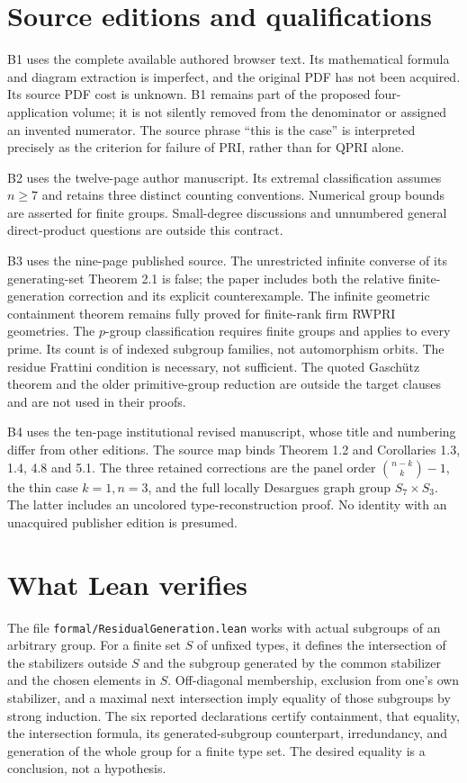\section{Source editions and qualifications}
B1 uses the complete available authored browser text. Its mathematical
formula and diagram extraction is imperfect, and the original PDF has
not been acquired. Its source PDF cost is unknown. B1 remains part of
the proposed four-application volume; it is not silently removed from
the denominator or assigned an invented numerator. The source phrase
``this is the case'' is interpreted precisely as the criterion for
failure of PRI, rather than for QPRI alone.

B2 uses the twelve-page author manuscript. Its extremal classification
assumes $n\geq7$ and retains three distinct counting conventions. Numerical
group bounds are asserted for finite groups. Small-degree discussions
and unnumbered general direct-product questions are outside this contract.

B3 uses the nine-page published source. The unrestricted infinite converse
of its generating-set Theorem 2.1 is false; the paper includes both the
relative finite-generation correction and its explicit counterexample.
The infinite geometric containment theorem remains fully proved for
finite-rank firm RWPRI geometries. The $p$-group classification requires
finite groups and applies to every prime. Its count is of indexed
subgroup families, not automorphism orbits. The residue Frattini condition
is necessary, not sufficient. The quoted Gasch\"utz theorem and the older
primitive-group reduction are outside the target clauses and are not
used in their proofs.

B4 uses the ten-page institutional revised manuscript, whose title and
numbering differ from other editions. The source map binds Theorem 1.2
and Corollaries 1.3, 1.4, 4.8 and 5.1. The three retained corrections are
the panel order $\binom{n-k}{k}-1$, the thin case $k=1,n=3$, and the full
locally Desargues graph group $S_7\times S_3$. The latter includes an
uncolored type-reconstruction proof. No identity with an unacquired
publisher edition is presumed.

\section{What Lean verifies}
The file \texttt{formal/ResidualGeneration.lean} works with actual
subgroups of an arbitrary group. For a finite set $S$ of unfixed types,
it defines the intersection of the stabilizers outside $S$ and the
subgroup generated by the common stabilizer and the chosen elements in
$S$. Off-diagonal membership, exclusion from one's own stabilizer, and
a maximal next intersection imply equality of those subgroups by strong
induction. The six reported declarations certify containment, that
equality, the intersection formula, its generated-subgroup counterpart,
irredundancy, and generation of the whole group for a finite type set.
The desired equality is a conclusion, not a hypothesis.

